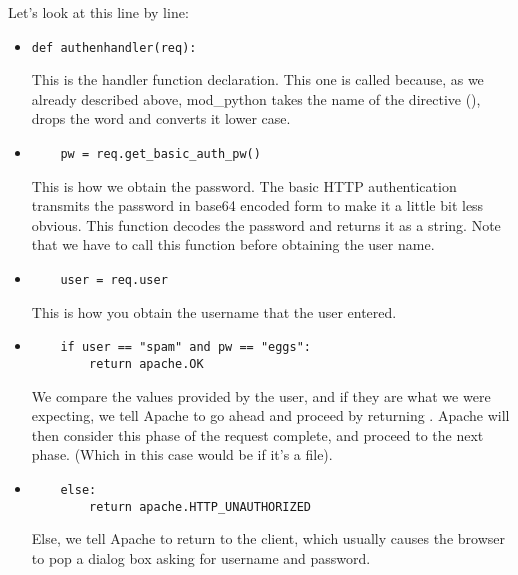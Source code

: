 Let's look at this line by line: 

\begin{itemize}

\item
  \begin{verbatim}
def authenhandler(req):
  \end{verbatim}

  This is the handler function declaration. This one is called
   because, as we already described above,
  mod_python takes the name of the directive
  (), drops the word  and converts
  it lower case.

\item
  \begin{verbatim}
    pw = req.get_basic_auth_pw()
  \end{verbatim}
  
  This is how we obtain the password. The basic HTTP authentication
  transmits the password in base64 encoded form to make it a little
  bit less obvious. This function decodes the password and returns it
  as a string. Note that we have to call this function before obtaining
  the user name.

\item
  \begin{verbatim}
    user = req.user
  \end{verbatim}
  
  This is how you obtain the username that the user entered. 

\item
  \begin{verbatim}
    if user == "spam" and pw == "eggs":
        return apache.OK
  \end{verbatim}

  We compare the values provided by the user, and if they are what we
  were expecting, we tell Apache to go ahead and proceed by returning
  . Apache will then consider this phase of the
  request complete, and proceed to the next phase. (Which in this case
  would be  if it's a  file).

\item
  \begin{verbatim}
    else:
        return apache.HTTP_UNAUTHORIZED 
  \end{verbatim}

  Else, we tell Apache to return  to the
  client, which usually causes the browser to pop a dialog box asking
  for username and password.

\end{itemize}

